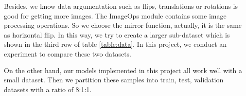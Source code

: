 Besides, we know data argumentation such as flips, translations or rotations is good for getting more images. The ImageOps module contains some image processing operations. So we choose the mirror function, actually, it is the same as horizontal flip. In this way, we try to create a larger sub-dataset which is shown in the third row of table \ref{table:data}. In this project, we conduct an experiment to compare these two datasets. 

On the other hand, our models implemented in this project all work well with a small dataset. Then we partition these samples into train, test, validation datasets with a ratio of 8:1:1. 

